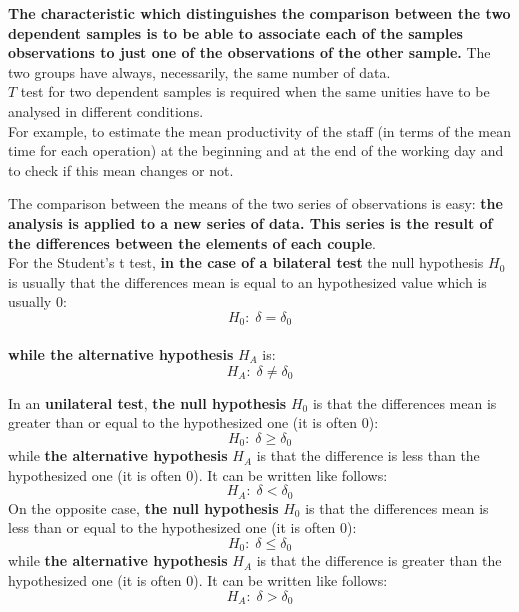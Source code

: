 \begin{frame}
  \vspace*{.25cm}
  \textbf{The characteristic which distinguishes the comparison between the two dependent samples is to be able to associate each of the samples observations to just one of the observations of the other sample.} The two groups have always, necessarily, the same number of data.\\
  \vspace*{.5cm}
  $ T $ test for two dependent samples is required when the same unities have to be analysed in different conditions.\\
  \vspace*{.25cm}
  For example, to estimate the mean productivity of the staff (in terms of the mean time for each operation) at the beginning and at the end of the working day and to check if this mean changes or not.
\end{frame}

\begin{frame}
  \vspace*{.25cm}
  The comparison between the means of the two series of observations is easy: \textbf{the analysis is applied to a new series of data. This series is the result of the differences between the elements of each couple}.\\
  \vspace*{.5cm}
  For the Student's t test, \textbf{in the case of a bilateral test} the null hypothesis $ H_0 $ is usually that the differences mean is equal to an hypothesized value which is usually 0: \\
  $$ H_0: \; \delta = \delta_0 $$\\
  \vspace*{.25cm}
  \textbf{while the alternative hypothesis} {\boldmath$H_A$} is:\\
  $$ H_A: \; \delta \neq \delta_0 $$
  \vspace*{.25cm}
\end{frame}

\begin{frame}
  \vspace*{.1cm}
  In an \textbf{unilateral test}, \textbf{the null hypothesis} $ H_0 $ is that the differences mean is greater than or equal to the hypothesized one (it is often 0):
  $$ H_0:\;\delta \geq \delta_0 $$
  while \textbf{the alternative hypothesis} $ H_A $ is that the difference is less than the hypothesized one (it is often 0). It can be written like follows:
  $$ H_A:\; \delta < \delta_0 $$
  On the opposite case, \textbf{the null hypothesis} $ H_0 $ is that the differences mean is less than or equal to the hypothesized one (it is often 0):
  $$ H_0:\;\delta \leq \delta_0 $$
  while \textbf{the alternative hypothesis} $ H_A $ is that the difference is greater than the hypothesized one (it is often 0). It can be written like follows:
  $$ H_A:\; \delta > \delta_0 $$
\end{frame}

